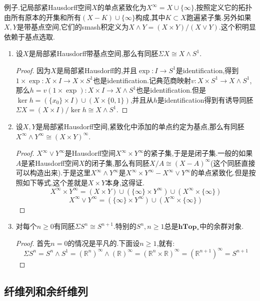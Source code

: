 例子.记局部紧Hausdorff空间$X$的单点紧致化为$X^{\infty}=X\cup\{\infty\}$,按照定义它的拓扑由所有原本的开集和所有$(X-K)\cup\{\infty\}$构成,其中$K\subset X$跑遍紧子集.另外如果$X,Y$是带基点空间,它们的smash积定义为$X\wedge Y=(X\times Y)/(X\vee Y)$.这个积明显依赖于基点选取.
\begin{enumerate}
	\item 设$X$是局部紧Hausdorff带基点空间,那么有同胚$\Sigma X\cong X\wedge S^1$.
	\begin{proof}
		
		因为$X$是局部紧Hausdorff的,并且$\exp:I\to S^1$是identification,得到$1\times\exp: X\times I\to X\times S^1$也是identification.记典范商映射$v:X\times S^1\to X\wedge S^1$,那么$h=v(1\times\exp):X\times I\to X\wedge S^1$也是identification.但是$\ker h=(\{x_0\}\times I)\cup(X\times\{0,1\})$,并且从$h$是identification得到有诱导同胚$\Sigma X=(X\times I)/\ker h\cong X\wedge S^1$.
	\end{proof}
    \item 设$X,Y$是局部紧Hausdorff空间,紧致化中添加的单点约定为基点,那么有同胚$X^{\infty}\wedge Y^{\infty}\cong(X\times Y)^{\infty}$.
    \begin{proof}
    	
    	$X^{\infty}\vee Y^{\infty}$是Hausdorff空间$X^{\infty}\times Y^{\infty}$的紧子集,于是是闭子集.一般的如果$A$是紧Hausdorff空间$X$的闭子集,那么有同胚$X/A\cong(X-A)^{\infty}$(这个同胚直接可以构造出来).于是这里$X^{\infty}\wedge Y^{\infty}$是$X^{\infty}\times Y^{\infty}-X^{\infty}\vee Y^{\infty}$的单点紧致化.但是按照如下等式,这个差就是$X\times Y$本身,这得证.
    	$$X^{\infty}\times Y^{\infty}=(X\times Y)\cup(\{\infty\}\times Y^{\infty})\cup(X^{\infty}\times\{\infty\})$$
    	$$X^{\infty}\vee Y^{\infty}=(\{\infty\}\times Y^{\infty})\cup(X^{\infty}\times\{\infty\})$$
    \end{proof}
    \item 对每个$n\ge0$有同胚$\Sigma S^n\cong S^{n+1}$.特别的$S^n,n\ge1$总是$\textbf{hTop}_*$中的余群对象.
    \begin{proof}
    	
    	首先$n=0$的情况是平凡的.下面设$n\ge1$,就有:
    	$$\Sigma S^n=S^n\wedge S^1=(\mathbb{R}^n)^{\infty}\wedge(\mathbb{R})^{\infty}=(\mathbb{R}^n\times\mathbb{R})^{\infty}=(\mathbb{R}^{n+1})^{\infty}=S^{n+1}$$
    \end{proof}
\end{enumerate}
\newpage
\subsection{纤维列和余纤维列}

